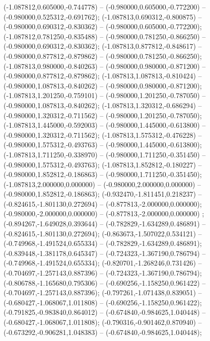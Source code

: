  (-1.087812,0.605000,-0.744778) -- (-0.980000,0.605000,-0.772200) -- (-0.980000,0.525312,-0.691762);
 (-1.087813,0.690312,-0.800875) -- (-0.980000,0.690312,-0.830362) -- (-0.980000,0.605000,-0.772200);
 (-1.087812,0.781250,-0.835488) -- (-0.980000,0.781250,-0.866250) -- (-0.980000,0.690312,-0.830362);
 (-1.087813,0.877812,-0.848617) -- (-0.980000,0.877812,-0.879862) -- (-0.980000,0.781250,-0.866250);
 (-1.087813,0.980000,-0.840263) -- (-0.980000,0.980000,-0.871200) -- (-0.980000,0.877812,-0.879862);
 (-1.087813,1.087813,-0.810424) -- (-0.980000,1.087813,-0.840262) -- (-0.980000,0.980000,-0.871200);
 (-1.087813,1.201250,-0.759101) -- (-0.980000,1.201250,-0.787050) -- (-0.980000,1.087813,-0.840262);
 (-1.087813,1.320312,-0.686294) -- (-0.980000,1.320312,-0.711562) -- (-0.980000,1.201250,-0.787050);
 (-1.087813,1.445000,-0.592003) -- (-0.980000,1.445000,-0.613800) -- (-0.980000,1.320312,-0.711562);
 (-1.087813,1.575312,-0.476228) -- (-0.980000,1.575312,-0.493763) -- (-0.980000,1.445000,-0.613800);
 (-1.087813,1.711250,-0.338970) -- (-0.980000,1.711250,-0.351450) -- (-0.980000,1.575312,-0.493763);
 (-1.087813,1.852812,-0.180227) -- (-0.980000,1.852812,-0.186863) -- (-0.980000,1.711250,-0.351450);
 (-1.087813,2.000000,0.000000) -- (-0.980000,2.000000,0.000000) -- (-0.980000,1.852812,-0.186863);
 (-0.932470,-1.811451,0.218237) -- (-0.824615,-1.801130,0.272694) -- (-0.877813,-2.000000,0.000000);
 (-0.980000,-2.000000,0.000000) -- (-0.877813,-2.000000,0.000000) ;
 (-0.894267,-1.649028,0.393644) -- (-0.782829,-1.634289,0.486891) -- (-0.824615,-1.801130,0.272694);
 (-0.863673,-1.507022,0.534121) -- (-0.749968,-1.491524,0.655334) -- (-0.782829,-1.634289,0.486891);
 (-0.839448,-1.381178,0.645347) -- (-0.724323,-1.367190,0.786794) -- (-0.749968,-1.491524,0.655334);
 (-0.820701,-1.268246,0.731426) -- (-0.704697,-1.257143,0.887396) -- (-0.724323,-1.367190,0.786794);
 (-0.806788,-1.165680,0.795306) -- (-0.690256,-1.158250,0.961422) -- (-0.704697,-1.257143,0.887396);
 (-0.797261,-1.071438,0.839051) -- (-0.680427,-1.068067,1.011808) -- (-0.690256,-1.158250,0.961422);
 (-0.791825,-0.983840,0.864012) -- (-0.674840,-0.984625,1.040448) -- (-0.680427,-1.068067,1.011808);
 (-0.790316,-0.901462,0.870940) -- (-0.673292,-0.906281,1.048383) -- (-0.674840,-0.984625,1.040448);
